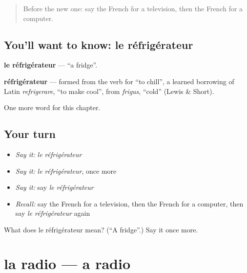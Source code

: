 \label{lesson:FR-C111-refrigerateur}



\begin{quote}
Before the new one: say the French for a television, then the French for a computer.
\end{quote}

\subsection*{You'll want to know: le réfrigérateur}
\textbf{le réfrigérateur} — \textquotedblleft{}a fridge\textquotedblright{}.

\begin{cousinweb}
\textbf{réfrigérateur} — formed from the verb for \textquotedblleft{}to chill\textquotedblright{}, a learned borrowing of Latin \emph{refrigerare}, \textquotedblleft{}to make cool\textquotedblright{}, from \emph{frigus}, \textquotedblleft{}cold\textquotedblright{} (Lewis \& Short).
\end{cousinweb}

\begin{grammarlens}[title={What you've built}]
One more word for this chapter.
\end{grammarlens}

\subsection*{Your turn}
\begin{itemize}
\raggedright
  \item \emph{Say it:} \emph{le réfrigérateur}
  \item \emph{Say it:} \emph{le réfrigérateur}, once more
  \item \emph{Say it:} say \emph{le réfrigérateur}
  \item \emph{Recall:} say the French for a television, then the French for a computer, then say \emph{le réfrigérateur} again
\end{itemize}

\begin{tcolorbox}[breakable,colback=teal!4,colframe=teal!35!black,title={Before you move on}]
What does le réfrigérateur mean? (\textquotedblleft{}A fridge\textquotedblright{}.) Say it once more.
\end{tcolorbox}
\section[la radio]{la radio — a radio}

